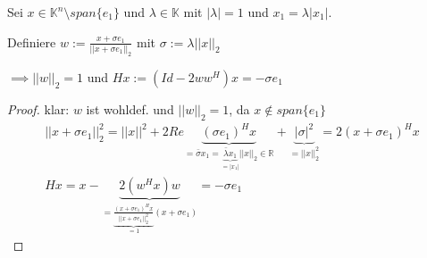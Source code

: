 \begin{lemma}
	Sei $x \in \mathbb{K}^n\setminus span\{e_1\}$ und $\lambda \in \mathbb{K}$ mit $|\lambda| = 1$ und $x_1 = \lambda |x_1|$.
	
	Definiere $w := \frac{x + \sigma e_1}{||x + \sigma e_1||_2}$ mit $\sigma := \lambda ||x||_2$
	
	$\implies ||w||_2 = 1$ und $Hx := (Id - 2ww^H)x = -\sigma e_1$
\end{lemma}

\begin{proof}
	klar: $w$ ist wohldef. und $||w||_2 = 1$, da $x \notin span\{e_1\}$
	\begin{align*}
		||x + \sigma e_1||_2^2 = ||x||^2 + 2 Re\underbrace{(\sigma e_1)^H x}_{= \bar{\sigma} x_1 = \underbrace{\bar{\lambda}x_1}_{=|x_1|} ||x||_2 \in \mathbb{R}} + \underbrace{|\sigma|^2}_{=||x||_2^2} =
		2(x+\sigma e_1)^H x\\
		Hx = x - \underbrace{2 (w^Hx)w}_{= \underbrace{\frac{(x+\sigma e_1)^Hx}{||x+\sigma e_1||_2^2}}_{=1} (x+\sigma e_1)} = -\sigma e_1
	\end{align*}
\end{proof}

